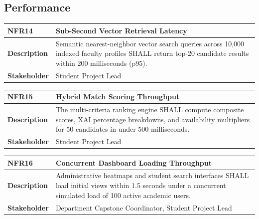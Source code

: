 \subsection{Performance}
\label{subsec:nfr_performance}

\begin{table}[H]
\centering
\small
\begin{tabularx}{\textwidth}{|l|X|}
\hline
\rowcolor{lightgray!40} \textbf{NFR14} & \textbf{Sub-Second Vector Retrieval Latency} \\ \hline
\textbf{Description} & Semantic nearest-neighbor vector search queries across 10,000 indexed faculty profiles SHALL return top-20 candidate results within 200 milliseconds (p95). \\ \hline
\textbf{Stakeholder} & Student Project Lead \\ \hline
\end{tabularx}
\end{table}

\begin{table}[H]
\centering
\small
\begin{tabularx}{\textwidth}{|l|X|}
\hline
\rowcolor{lightgray!40} \textbf{NFR15} & \textbf{Hybrid Match Scoring Throughput} \\ \hline
\textbf{Description} & The multi-criteria ranking engine SHALL compute composite scores, XAI percentage breakdowns, and availability multipliers for 50 candidates in under 500 milliseconds. \\ \hline
\textbf{Stakeholder} & Student Project Lead \\ \hline
\end{tabularx}
\end{table}

\begin{table}[H]
\centering
\small
\begin{tabularx}{\textwidth}{|l|X|}
\hline
\rowcolor{lightgray!40} \textbf{NFR16} & \textbf{Concurrent Dashboard Loading Throughput} \\ \hline
\textbf{Description} & Administrative heatmaps and student search interfaces SHALL load initial views within 1.5 seconds under a concurrent simulated load of 100 active academic users. \\ \hline
\textbf{Stakeholder} & Department Capstone Coordinator, Student Project Lead \\ \hline
\end{tabularx}
\end{table}

